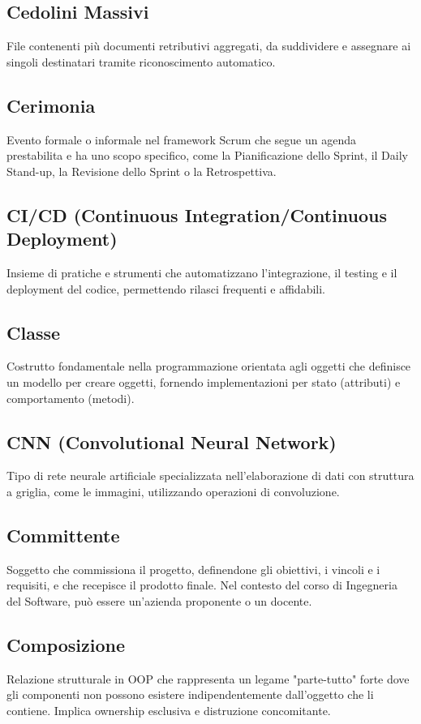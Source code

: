 \documentclass[a4paper,11pt]{article}
\begin{document}
\subsection{Cedolini Massivi}
File contenenti più documenti retributivi aggregati, da suddividere e assegnare ai singoli destinatari tramite riconoscimento automatico.

\subsection{Cerimonia}
Evento formale o informale nel framework Scrum che segue un agenda prestabilita e ha uno scopo specifico, come la Pianificazione dello Sprint, il Daily Stand-up, la Revisione dello Sprint o la Retrospettiva.

\subsection{CI/CD (Continuous Integration/Continuous Deployment)}
Insieme di pratiche e strumenti che automatizzano l'integrazione, il testing e il deployment del codice, permettendo rilasci frequenti e affidabili.

\subsection{Classe}
Costrutto fondamentale nella programmazione orientata agli oggetti che definisce un modello per creare oggetti, fornendo implementazioni per stato (attributi) e comportamento (metodi).

\subsection{CNN (Convolutional Neural Network)}
Tipo di rete neurale artificiale specializzata nell'elaborazione di dati con struttura a griglia, come le immagini, utilizzando operazioni di convoluzione.

\subsection{Committente}
Soggetto che commissiona il progetto, definendone gli obiettivi, i vincoli e i requisiti, e che recepisce il prodotto finale. Nel contesto del corso di Ingegneria del Software, può essere un'azienda proponente o un docente.

\subsection{Composizione}
Relazione strutturale in OOP che rappresenta un legame "parte-tutto" forte dove gli componenti non possono esistere indipendentemente dall'oggetto che li contiene. Implica ownership esclusiva e distruzione concomitante.
\end{document}
